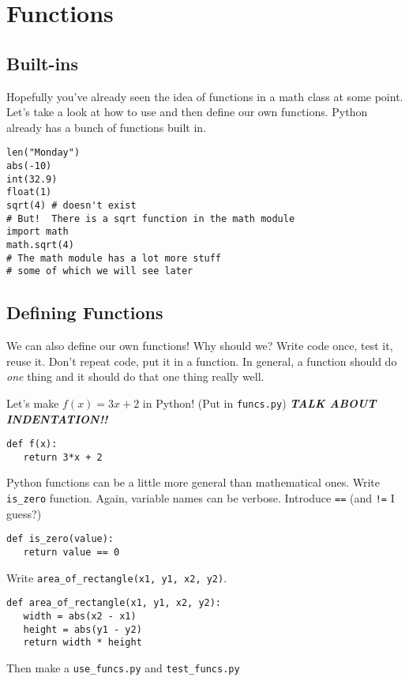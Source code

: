 \documentclass[12pt]{article}
\begin{document}
\section{Functions}

\subsection{Built-ins}
Hopefully you've already seen the idea of functions in a math class at some
point.  Let's take a look at how to use and then define our own functions.
Python already has a bunch of functions built in.

\begin{lstlisting}
len("Monday")
abs(-10)
int(32.9)
float(1)
sqrt(4) # doesn't exist
# But!  There is a sqrt function in the math module
import math
math.sqrt(4)
# The math module has a lot more stuff
# some of which we will see later
\end{lstlisting}

\subsection{Defining Functions}

We can also define our own functions!  Why should we?  Write code once, test
it, reuse it.  Don't repeat code, put it in a function.  In general, a function
should do \emph{one} thing and it should do that one thing really well.

\noindent
Let's make \(f(x) = 3x + 2\) in Python!  (Put in \lstinline{funcs.py})
\textbf{\emph{TALK ABOUT INDENTATION!!}}

\begin{lstlisting}
def f(x):
   return 3*x + 2
\end{lstlisting}

\noindent
Python functions can be a little more general than mathematical ones.  Write
\lstinline{is_zero} function.  Again, variable names can be verbose.  Introduce
\lstinline{==} (and \lstinline{!=} I guess?)

\begin{lstlisting}
def is_zero(value):
   return value == 0
\end{lstlisting}

\noindent
Write \lstinline{area_of_rectangle(x1, y1, x2, y2)}.

\hfill
{}

\begin{lstlisting}
def area_of_rectangle(x1, y1, x2, y2):
   width = abs(x2 - x1)
   height = abs(y1 - y2)
   return width * height
\end{lstlisting}

\noindent
Then make a \lstinline{use_funcs.py} and \lstinline{test_funcs.py}
\end{document}
